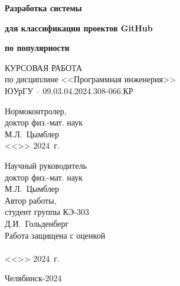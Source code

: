 \begin{adjustwidth}[]{0cm}{0cm}
\begin{center}
\begin{linespread}{1}




{
\large\textbf{Разработка системы}

\vspace{-5pt}

\large\textbf{для классификации проектов GitHub}

\vspace{-5pt}

\large\textbf{по популярности}

}
\vspace{2em}

КУРСОВАЯ РАБОТА \\
по дисциплине <<Программная инженерия>>\\
ЮУрГУ -- 09.03.04.2024.308-066.КР



\parbox[t]{7cm}{
Нормоконтролер,\\[0.5em]
доктор физ.-мат. наук \\[0.5em]
\underfield{} М.Л.~Цымблер \\[0.5em]
<<\underline{\qquad}>>\underfield{} 2024~г.
}
\hfill{}
\parbox[t]{7cm}{
Научный руководитель \\
доктор физ.-мат. наук\\[0.5em]
\underfield{} М.Л.~Цымблер \\[2.5em]
Автор работы, \\
студент группы КЭ-303\\[0.5em]
\underfield{} Д.И.~Гольденберг \\[2.5em]
Работа защищена с оценкой \\[0.5em]
\underfield{}  \\[0.5em]
<<\underline{\qquad}>>\underfield{} 2024~г.

}


Челябинск-2024

\end{linespread}
\end{center}
\end{adjustwidth}

\pagebreak
